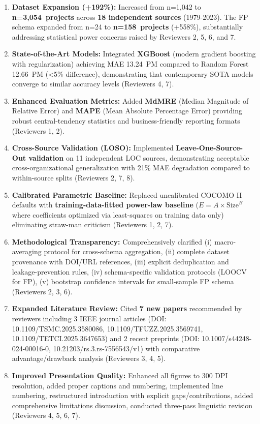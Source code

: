 \documentclass[11pt,a4paper]{article}
\begin{document}
\begin{enumerate}[leftmargin=*]
    \item \textbf{Dataset Expansion (+192\%):} Increased from n=1,042 to \textbf{n=3,054~projects} across \textbf{18 independent sources} (1979-2023). The FP schema expanded from n=24 to \textbf{n=158~projects} (+558\%), substantially addressing statistical power concerns raised by Reviewers 2, 5, 6, and 7.
    
    \item \textbf{State-of-the-Art Models:} Integrated \textbf{XGBoost} (modern gradient boosting with regularization) achieving MAE 13.24~PM compared to Random Forest 12.66~PM (<5\% difference), demonstrating that contemporary SOTA models converge to similar accuracy levels (Reviewers 4, 7).
    
    \item \textbf{Enhanced Evaluation Metrics:} Added \textbf{MdMRE} (Median Magnitude of Relative Error) and \textbf{MAPE} (Mean Absolute Percentage Error) providing robust central-tendency statistics and business-friendly reporting formats (Reviewers 1, 2).
    
    \item \textbf{Cross-Source Validation (LOSO):} Implemented \textbf{Leave-One-Source-Out validation} on 11 independent LOC sources, demonstrating acceptable cross-organizational generalization with 21\% MAE degradation compared to within-source splits (Reviewers 2, 7, 8).
    
    \item \textbf{Calibrated Parametric Baseline:} Replaced uncalibrated COCOMO II defaults with \textbf{training-data-fitted power-law baseline} ($E = A \times \text{Size}^B$ where coefficients optimized via least-squares on training data only) eliminating straw-man criticism (Reviewers 1, 2, 7).
    
    \item \textbf{Methodological Transparency:} Comprehensively clarified (i) macro-averaging protocol for cross-schema aggregation, (ii) complete dataset provenance with DOI/URL references, (iii) explicit deduplication and leakage-prevention rules, (iv) schema-specific validation protocols (LOOCV for FP), (v) bootstrap confidence intervals for small-sample FP schema (Reviewers 2, 3, 6).
    
    \item \textbf{Expanded Literature Review:} Cited \textbf{7 new papers} recommended by reviewers including 3 IEEE journal articles (DOI: 10.1109/TSMC.2025.3580086, 10.1109/TFUZZ.2025.3569741, 10.1109/TETCI.2025.3647653) and 2 recent preprints (DOI: 10.1007/s44248-024-00016-0, 10.21203/rs.3.rs-7556543/v1) with comparative advantage/drawback analysis (Reviewers 3, 4, 5).
    
    \item \textbf{Improved Presentation Quality:} Enhanced all figures to 300 DPI resolution, added proper captions and numbering, implemented line numbering, restructured introduction with explicit gaps/contributions, added comprehensive limitations discussion, conducted three-pass linguistic revision (Reviewers 4, 5, 6, 7).
\end{enumerate}
\end{document}
